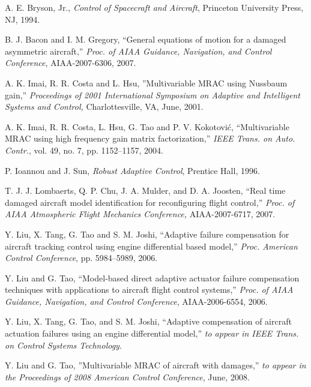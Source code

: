 \documentclass[letterpaper, 10 pt, conference]{ieeeconf}
\begin{document}
\begin{thebibliography}{199}
\setlength{\itemsep}{-2mm}



 A. E. Bryson, Jr., {\it Control of
    Spacecraft and Aircraft}, Princeton University
  Press, NJ, 1994.



 B. J. Bacon and I. M. Gregory,
  ``General equations of motion for a damaged
  asymmetric aircraft,'' {\it Proc. of AIAA
    Guidance, Navigation, and Control Conference},
  AIAA-2007-6306, 2007.


 A. K. Imai, R. R. Costa and
  L. Hsu, ''Multivariable MRAC using Nussbaum
  gain,'' {\it Proceedings of 2001 International
    Symposium on Adaptive and Intelligent Systems
    and Control,} Charlottesville, VA, June, 2001.

 A. K. Imai, R. R. Costa, L. Hsu,
  G. Tao and P. V. Kokotovi\'{c}, ``Multivariable
  MRAC using high frequency gain matrix
  factorization,'' {\it IEEE Trans. on
    Auto. Contr.}, vol. 49, no. 7,
  pp. 1152--1157, 2004.


 P. Ioannou and J. Sun, {\it Robust
    Adaptive Control}, Prentice Hall, 1996.



 T. J. J. Lombaerts, Q. P. Chu,
  J. A. Mulder, and D. A. Joosten, ``Real time
  damaged aircraft model identification for
  reconfiguring flight control,'' {\it Proc.
    of AIAA Atmospheric Flight Mechanics
    Conference,} AIAA-2007-6717, 2007.


 Y. Liu, X. Tang, G. Tao and
  S. M. Joshi, ``Adaptive failure compensation for
  aircraft tracking control using engine
  differential based model,'' {\it Proc. American
    Control Conference}, pp. 5984--5989, 2006.


 Y. Liu and G. Tao, ``Model-based
  direct adaptive actuator failure compensation
  techniques with applications to aircraft flight
  control systems,'' {\it Proc. of AIAA
    Guidance, Navigation, and Control Conference},
  AIAA-2006-6554, 2006.


 Y. Liu, X. Tang, G. Tao, and
  S. M. Joshi, ``Adaptive compensation of aircraft
  actuation failures using an engine differential
  model,'' {\it to appear in IEEE Trans. on
    Control Systems Technology}.

 Y. Liu and G. Tao, ''Multivariable
  MRAC of aircraft with damages,'' {\it to appear
    in the Proceedings of 2008 American Control
    Conference}, June, 2008.


\end{thebibliography}
\end{document}
